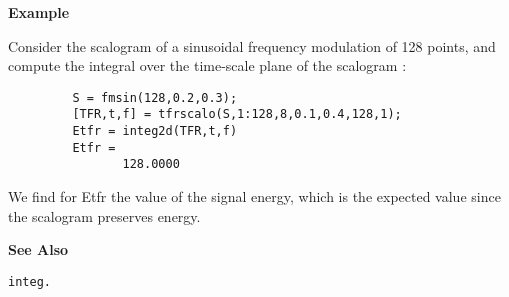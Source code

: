 {\bf \large {}\selectfont Example}\\
\hspace*{1.5cm}
\begin{minipage}[t]{13.5cm}
Consider the scalogram of a sinusoidal frequency modulation of 128 points,
and compute the integral over the time-scale plane of the scalogram :
\begin{verbatim}
         S = fmsin(128,0.2,0.3);
         [TFR,t,f] = tfrscalo(S,1:128,8,0.1,0.4,128,1);
         Etfr = integ2d(TFR,t,f)
         Etfr = 
                128.0000
\end{verbatim}
We find for {\ty Etfr} the value of the signal energy, which is the
expected value since the scalogram preserves energy.
\end{minipage}
\vspace*{.5cm}


{\bf \large {}\selectfont See Also}\\
\hspace*{1.5cm}
\begin{minipage}[t]{13.5cm}
\begin{verbatim}
integ.
\end{verbatim}
\end{minipage}



